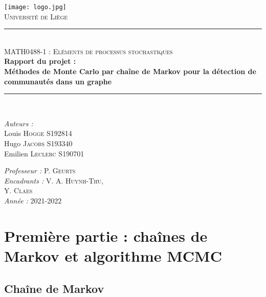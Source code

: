 \documentclass[a4paper, 11pt]{article}
\newcommand{\HRule}{\rule{\linewidth}{0.5mm}}
\begin{document}
\begin{titlepage}


\begin{center}
\texttt{[image: logo.jpg]}\\
\vspace{1cm}
\textsc{\huge Université de Liège}\\[1.2cm]
\HRule \\[1cm]
\textsc{\LARGE MATH0488-1 : Eléments de processus stochastiques }\\[1cm]
{\Huge \bfseries Rapport du projet : \\ Méthodes de Monte Carlo par chaîne de Markov pour la détection de communautés dans un graphe}\\[1.4cm] 
\HRule \\[1cm]
    
\end{center}

\begin{minipage}{0.4\textwidth}
      \begin{flushleft} \large
        \emph{Auteurs : } \\
        Louis \textsc{Hogge}  S192814\\
        Hugo \textsc{Jacobs}  S193340 \\   
        Emilien \textsc{Leclerc} S190701 \\

      \end{flushleft}
\end{minipage}
\begin{minipage}{0.45\textwidth}
      \begin{flushright} \large
        \emph{Professeur : } P. \textsc{Geurts}\\
        \emph{Encadrants : } V. A.\textsc{ Huynh-Thu},\\ Y. \textsc{Claes}\\
        \emph{Année : } 2021-2022
      \end{flushright}
\end{minipage}
\end{titlepage}

\tableofcontents
\newpage
\listoffigures
\newpage

\section{Première partie : chaînes de Markov et algorithme MCMC}

\subsection{Chaîne de Markov}
\end{document}
